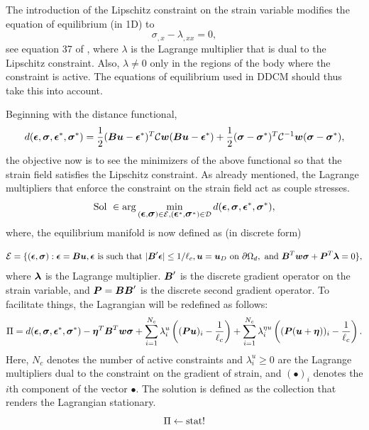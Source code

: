 \documentclass[11pt]{elsarticle}
\begin{document}
The introduction of the Lipschitz constraint on the strain variable modifies the equation of equilibrium (in 1D) to 
\begin{equation}
	\sigma_{,x}- \lambda_{,xx}=0,\label{equil_couple_1D}
\end{equation}
see equation 37 of \cite{Kamasamudram2023}, where $\lambda$ is the Lagrange multiplier that is dual to the Lipschitz constraint. Also, $\lambda \neq 0$ only in the regions of the body where the constraint is active. The equations of equilibrium used in DDCM should thus take this into account. 

Beginning with the distance functional,
\begin{equation}
	d(\mbox{\boldmath $\epsilon$},\mbox{\boldmath $\sigma$},\mbox{\boldmath $\epsilon$}^*,\mbox{\boldmath $\sigma$}^*) = \frac{1}{2}(\mbox{\boldmath $B$} \mbox{\boldmath $u$} - \mbox{\boldmath $\epsilon$}^*)^T\mathcal{C}\mbox{\boldmath $w$}(\mbox{\boldmath $B$} \mbox{\boldmath $u$} - \mbox{\boldmath $\epsilon$}^*) + \frac{1}{2}(\mbox{\boldmath $\sigma$} - \mbox{\boldmath $\sigma$}^*)^T\mathcal{C}^{-1}\mbox{\boldmath $w$}(\mbox{\boldmath $\sigma$} - \mbox{\boldmath $\sigma$}^*),
\end{equation}
the objective now is to see the minimizers of the above functional so that the strain field satisfies the Lipschitz constraint. As already mentioned, the Lagrange multipliers that enforce the constraint on the strain field act as couple stresses.
\begin{equation}
	\text{Sol } \in \arg \min_{(\mbox{\boldmath $\epsilon$},\mbox{\boldmath $\sigma$}) \in \mathcal{E}, (\mbox{\boldmath $\epsilon$}^*,\mbox{\boldmath $\sigma$}^*) \in \mathcal{D}} d(\mbox{\boldmath $\epsilon$},\mbox{\boldmath $\sigma$},\mbox{\boldmath $\epsilon$}^*,\mbox{\boldmath $\sigma$}^*),
\end{equation}
where, the equilibrium manifold is now defined as (in discrete form)
 

\begin{equation}
	\mathcal{E} = \{(\mbox{\boldmath $\epsilon$},\mbox{\boldmath $\sigma$}) : \mbox{\boldmath $\epsilon$} = \mbox{\boldmath $B$} \mbox{\boldmath $u$}, \mbox{\boldmath $\epsilon$} \text{ is such that } |\mbox{\boldmath $B$}' \mbox{\boldmath $\epsilon$}|  \leq 1/{\ell_c} ,\mbox{\boldmath $u$} = \mbox{\boldmath $u$}_D \text{ on } \partial \Omega_d,
	\text{ and } \mbox{\boldmath $B$} ^T\mbox{\boldmath $w$} \mbox{\boldmath $\sigma$} + \mbox{\boldmath $P$}^T \mbox{\boldmath $\lambda$} = 0     \},
\end{equation}
where $\mbox{\boldmath $\lambda$}$ is the Lagrange multiplier. $\mbox{\boldmath $B$}'$ is the discrete gradient operator on the strain variable, and $\mbox{\boldmath $P$} = \mbox{\boldmath $B$} \mbox{\boldmath $B$}'$ is the discrete second gradient operator. To facilitate things, the Lagrangian will be redefined as follows:
\begin{equation}
	\Pi = d(\mbox{\boldmath $\epsilon$},\mbox{\boldmath $\sigma$},\mbox{\boldmath $\epsilon$}^*,\mbox{\boldmath $\sigma$}^*) - \mbox{\boldmath $\eta$}^T \mbox{\boldmath $B$} ^T \mbox{\boldmath $w$}\mbox{\boldmath $\sigma$} + \sum_{i=1}^{N_c} \lambda^u_i \left( (\mbox{\boldmath $P$} \mbox{\boldmath $u$})_i - \frac{1}{\ell_c}   \right) + \sum_{i=1}^{N_c} \lambda^{\eta u}_i \left( (\mbox{\boldmath $P$} (\mbox{\boldmath $u$} + \mbox{\boldmath $\eta$}))_i - \frac{1}{\ell_c}   \right).
\end{equation}
Here, $N_c$ denotes the number of active constraints and $\lambda^u_i \geq 0$ are the Lagrange multipliers dual to the constraint on the gradient of strain, and $(\bullet)_i$ denotes the $i$th component of the vector $\bullet$. The solution is defined as the collection that renders the Lagrangian stationary.
\begin{equation}
	\Pi  \leftarrow \operatorname{stat}!
\end{equation}
\end{document}

